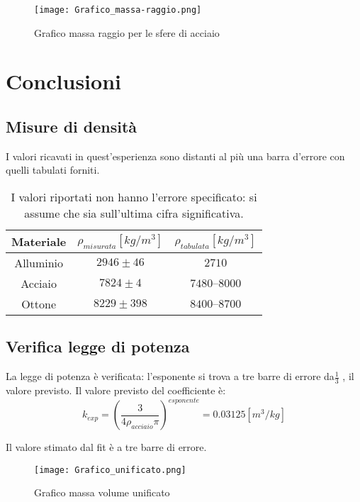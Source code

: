 \documentclass{article}
\begin{document}
\begin{figure}
	\texttt{[image: Grafico\_massa-raggio.png]}
		\caption{Grafico massa raggio per le sfere di acciaio}
\end{figure}

\section{Conclusioni}
\subsection{Misure di densità}
I valori ricavati in quest'esperienza sono distanti al più una barra d'errore con quelli tabulati forniti.

\begin{table}[H]
    \centering

    \begin{tabular}{|c|c|c|}
        \hline
        Materiale &$ \rho_{misurata}[kg/m^3]$ &$\rho_{tabulata}[kg/m^3]$ \\
        \hline
        Alluminio & $2946\pm46$ & $2710$ \\
        Acciaio & $7824\pm4$ & $7480–8000$ \\
        Ottone & $8229\pm398$ &  $8400–8700$  \\

        \hline
    \end{tabular}
    \caption{I valori riportati non hanno l'errore specificato: si assume che sia sull'ultima cifra significativa.}
    \label{tab:dati_sfere}
\end{table}

\subsection{Verifica legge di potenza}
La legge di potenza è verificata: l'esponente si trova a tre barre di errore da$\frac{1}{3}$ , il valore previsto.
Il valore previsto del coefficiente è: 
\begin{equation}
 k_{exp}=(\frac{3}{4\rho_{acciaio}\pi})^{esponente}=0.03125[m^3/kg]
\end{equation}

Il valore stimato dal fit è a tre barre di errore.


\begin{figure}
	\texttt{[image: Grafico\_unificato.png]}
		\caption{Grafico massa volume unificato}
\end{figure}
\end{document}
